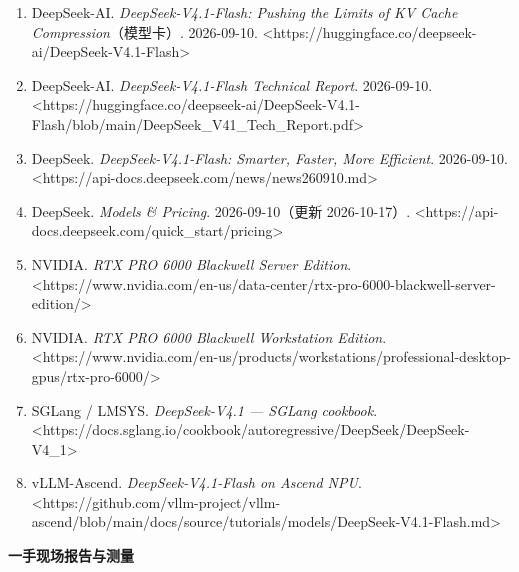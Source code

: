 \begin{enumerate}
  \item DeepSeek-AI. \textit{DeepSeek-V4.1-Flash: Pushing the Limits of KV Cache Compression}（模型卡）. 2026-09-10. <https://huggingface.co/deepseek-ai/DeepSeek-V4.1-Flash>
  \item DeepSeek-AI. \textit{DeepSeek-V4.1-Flash Technical Report}. 2026-09-10. <https://huggingface.co/deepseek-ai/DeepSeek-V4.1-Flash/blob/main/DeepSeek\_V41\_Tech\_Report.pdf>
  \item DeepSeek. \textit{DeepSeek-V4.1-Flash: Smarter, Faster, More Efficient}. 2026-09-10. <https://api-docs.deepseek.com/news/news260910.md>
  \item DeepSeek. \textit{Models \& Pricing}. 2026-09-10（更新 2026-10-17）. <https://api-docs.deepseek.com/quick\_start/pricing>
  \item NVIDIA. \textit{RTX PRO 6000 Blackwell Server Edition}. <https://www.nvidia.com/en-us/data-center/rtx-pro-6000-blackwell-server-edition/>
  \item NVIDIA. \textit{RTX PRO 6000 Blackwell Workstation Edition}. <https://www.nvidia.com/en-us/products/workstations/professional-desktop-gpus/rtx-pro-6000/>
  \item SGLang / LMSYS. \textit{DeepSeek-V4.1 — SGLang cookbook}. <https://docs.sglang.io/cookbook/autoregressive/DeepSeek/DeepSeek-V4\_1>
  \item vLLM-Ascend. \textit{DeepSeek-V4.1-Flash on Ascend NPU}. <https://github.com/vllm-project/vllm-ascend/blob/main/docs/source/tutorials/models/DeepSeek-V4.1-Flash.md>
\end{enumerate}

\textbf{一手现场报告与测量}


